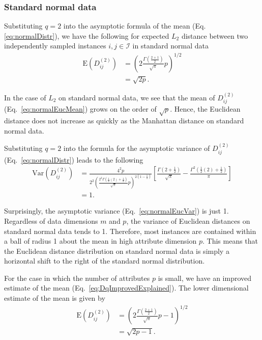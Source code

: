 \documentclass[aos]{imsart}
\begin{document}
\subsubsection{Standard normal data}

Substituting $q=2$ into the asymptotic formula of the mean (Eq. \ref{eq:normalDistr}), we have the following for expected $L_2$ distance between two independently sampled instances $i,j \in \mathcal{I}$ in standard normal data
%
\begin{equation}\label{eq:normalEucMean}
\begin{aligned}
\text{E}\left(D^{(2)}_{ij}\right) &= \left(2\frac{\Gamma\left(\frac{2 + 1}{2}\right)}{\sqrt{\pi}}p\right)^{1/2} \\
&= \sqrt{2p}.
\end{aligned}
\end{equation}

In the case of $L_2$ on standard normal data, we see that the mean of $D^{(2)}_{ij}$ (Eq.~\ref{eq:normalEucMean}) grows on the order of $\sqrt{p}$. Hence, the Euclidean distance does not increase as quickly as the Manhattan distance on standard normal data.

Substituting $q=2$ into the formula for the asymptotic variance of $D^{(2)}_{ij}$ (Eq.~\ref{eq:normalDistr}) leads to the following
%
\begin{equation}\label{eq:normalEucVar}
\begin{aligned}
\text{Var}\left(D^{(2)}_{ij}\right) &= \frac{4^2p}{2^2\left(\frac{2^2\Gamma\left(\frac{1}{2}(2) + \frac{1}{2}\right)}{\sqrt{\pi}}p\right)^{2\left(1 - \frac{1}{2}\right)}}\left[\frac{\Gamma\left(2 + \frac{1}{2}\right)}{\sqrt{\pi}} - \frac{\Gamma^2\left(\frac{1}{2}(2) + \frac{1}{2}\right)}{\pi}\right] \\
&= 1.
\end{aligned}
\end{equation}

Surprisingly, the asymptotic variance (Eq.~\ref{eq:normalEucVar}) is just 1. Regardless of data dimensions $m$ and $p$, the variance of Euclidean distances on standard normal data tends to 1. Therefore, most instances are contained within a ball of radius 1 about the mean in high attribute dimension $p$. This means that the Euclidean distance distribution on standard normal data is simply a horizontal shift to the right of the standard normal distribution.

For the case in which the number of attributes $p$ is small, we have an improved estimate of the mean (Eq.~\ref{eq:DqImprovedExplained}). The lower dimensional estimate of the mean is given by
%
\begin{equation}\label{eq:normalEucMeanImproved}
\begin{aligned}
\text{E}\left(D^{(2)}_{ij}\right) &= \left(2\frac{\Gamma\left(\frac{2 + 1}{2}\right)}{\sqrt{\pi}}p - 1\right)^{1/2} \\
&= \sqrt{2p - 1}.
\end{aligned}
\end{equation}
\end{document}
